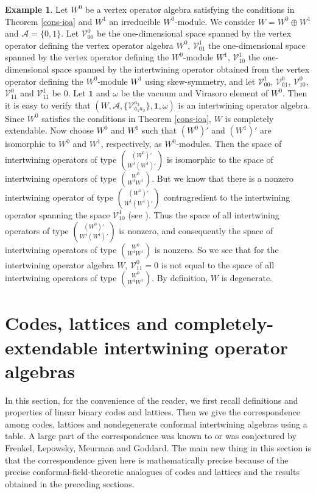 \documentclass{amsproc}
\theoremstyle{definition}
\newtheorem{expl}[thm]{Example}
\theoremstyle{remark}
\numberwithin{equation}{section}
\begin{document}
\begin{expl}
{\rm Let $W^{0}$ be a vertex operator algebra satisfying the conditions in 
Theorem \ref{cons-ioa} and $W^{1}$ an irreducible $W^{0}$-module. 
We consider $W=W^{0}\oplus W^{1}$ and $\mathcal{A}=\{0, 1\}$. 
Let $\mathcal{V}_{00}^{0}$  be the one-dimensional space spanned by the 
vertex operator defining the vertex operator algebra $W^{0}$,
$\mathcal{V}_{01}^{1}$  the one-dimensional space spanned by the 
vertex operator defining the $W^{0}$-module $W^{1}$, 
$\mathcal{V}_{10}^{1}$ the one-dimensional space spanned by the 
intertwining operator obtained from the 
vertex operator defining the $W^{0}$-module $W^{1}$ using skew-symmetry,
and let $\mathcal{V}_{00}^{1}$, $\mathcal{V}_{01}^{0}$, 
$\mathcal{V}_{10}^{0}$,
$\mathcal{V}_{11}^{0}$ and $\mathcal{V}_{11}^{1}$ be $0$.
Let $\mathbf{1}$ and $\omega$ be the vacuum and Virasoro element of 
$W^{0}$.
Then it is easy to verify that $(W, \mathcal{A}, 
\{\mathcal{V}_{a_{1}a_{2}}^{a_{3}}\}, \mathbf{1}, \omega)$ 
is an intertwining operator algebra. Since 
$W^{0}$  satisfies the conditions in 
Theorem \ref{cons-ioa}, $W$ is completely extendable. 
Now choose $W^{0}$ and $W^{1}$ such that $(W^{0})'$ and $(W^{1})'$ are
 isomorphic to $W^{0}$ and
$W^{1}$, respectively, as $W^{0}$-modules. Then 
the space of intertwining operators of type
$\binom{(W^{0})'}{W^{1}(W^{1})'}$ is isomorphic to the space of 
intertwining operators of type
$\binom{W^{0}}{W^{1}W^{1}}$.
But we know that there is a nonzero intertwining operator of type
$\binom{(W^{0})'}{W^{1}(W^{1})'}$ contragredient to 
the intertwining operator spanning the space $\mathcal{V}^{1}_{10}$
(see \cite{HL2}). Thus the space of all intertwining operators of type
$\binom{(W^{0})'}{W^{1}(W^{1})'}$ is nonzero, and consequently
the space of 
intertwining operators of type
$\binom{W^{0}}{W^{1}W^{1}}$ is nonzero. So we see that for the intertwining
operator algebra $W$, $\mathcal{V}_{11}^{0}=0$ is not equal to the
space of all intertwining operators of type $\binom{W^{0}}{W^{1}W^{1}}$. 
By definition, $W$ is degenerate.}
\end{expl}



\section{Codes, lattices and 
completely-extendable intertwining operator algebras}


In this section, for the convenience of the reader, we first recall
definitions and properties of linear binary codes and lattices.  Then we
give the correspondence among codes, lattices and
nondegenerate conformal intertwining  algebras using a table. 
A large part of the
correspondence was known to 
or was conjectured by Frenkel, Lepowsky, Meurman and
Goddard. The main  new thing in this section is that the correspondence 
given here
is mathematically precise because of the 
precise conformal-field-theoretic analogues of codes and lattices
and the results obtained in the preceding sections.
\end{document}
